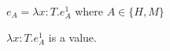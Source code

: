 \begin{case}

$e_{A}=\lambda x:T.e_{A}^{1}$ where $A\in\lbrace H,M\rbrace$

$\lambda x:T.e_{A}^{1}$ is a value.

\end{case}
